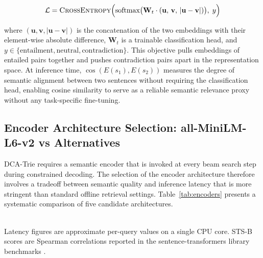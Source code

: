 \begin{equation}
    \mathcal{L} = \textsc{CrossEntropy}\Bigl(
    \text{softmax}\bigl(\mathbf{W}_t \cdot (\mathbf{u},\, \mathbf{v},\,
            |\mathbf{u} - \mathbf{v}|)\bigr),\; y
    \Bigr)
    \label{eq:sbert}
\end{equation}

where $(\mathbf{u}, \mathbf{v}, |\mathbf{u} - \mathbf{v}|)$ is the
concatenation of the two embeddings with their element-wise absolute difference,
$\mathbf{W}_t$ is a trainable classification head, and $y \in \{\text{entailment},
    \text{neutral}, \text{contradiction}\}$. This objective pulls embeddings of
entailed pairs together and pushes contradiction pairs apart in the representation
space. At inference time, $\cos(E(s_1), E(s_2))$ measures the degree of semantic
alignment between two sentences without requiring the classification head,
enabling cosine similarity to serve as a reliable semantic relevance proxy
without any task-specific fine-tuning.

\subsection{Encoder Architecture Selection: all-MiniLM-L6-v2 vs Alternatives}

DCA-Trie requires a semantic encoder that is invoked at every beam search step
during constrained decoding. The selection of the encoder architecture therefore
involves a tradeoff between semantic quality and inference latency that is more
stringent than standard offline retrieval settings. Table~\ref{tab:encoders}
presents a systematic comparison of five candidate architectures.

\begin{table}[H]
    \centering
    \caption{Comparison of sentence encoder architectures.}
    \label{tab:encoders}
    \\ \smallskip
    \noindent\footnotesize{Latency figures are approximate per-query values on a single CPU core.
        STS-B scores are Spearman correlations reported in the sentence-transformers
        library benchmarks \citep{reimers2019sentence}.}
\end{table}

